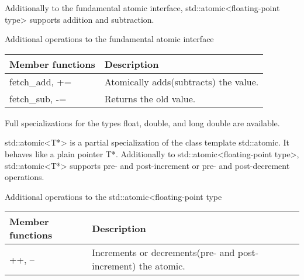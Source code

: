 
Additionally to the fundamental atomic interface, std::atomic<floating-point type> supports addition and subtraction.

\begin{center}
Additional operations to the fundamental atomic interface
\end{center}

\begin{longtable}[c]{|l|l|}
\hline
\textbf{Member functions} & \textbf{Description}                  \\ \hline
\endfirsthead
%
\endhead
%
fetch\_add, +=            & Atomically adds(subtracts) the value. \\ \hline
fetch\_sub, -=            & Returns the old value.                \\ \hline
\end{longtable}

Full specializations for the types float, double, and long double are available.


std::atomic<T*> is a partial specialization of the class template std::atomic. It behaves like a plain pointer T*. Additionally to std::atomic<floating-point type>, std::atomic<T*> supports pre- and post-increment or pre- and post-decrement operations.

\begin{center}
Additional operations to the std::atomic<floating-point type
\end{center}

\begin{longtable}[c]{|l|l|}
\hline
\textbf{Member functions} & \textbf{Description}                                          \\ \hline
\endfirsthead
%
\endhead
%
++, --                    & Increments or decrements(pre- and post-increment) the atomic. \\ \hline
\end{longtable}

